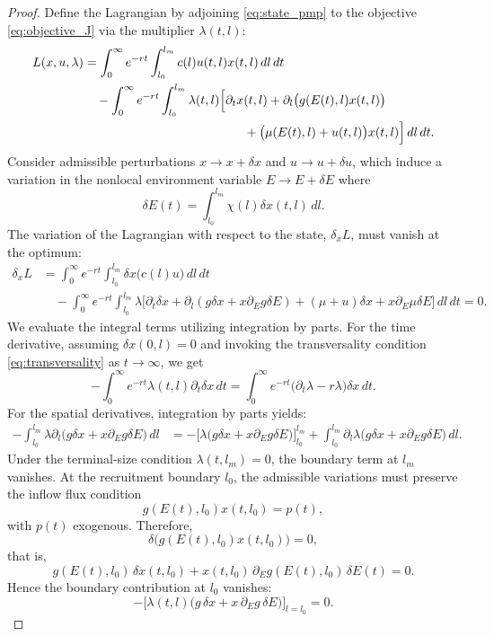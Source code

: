 \documentclass[pdflatex,sn-mathphys-num]{sn-jnl}
\theoremstyle{thmstyleone}
\theoremstyle{definition}
\theoremstyle{remark}
\begin{document}
\begin{proof}
Define the Lagrangian by adjoining \eqref{eq:state_pmp} to the objective
\eqref{eq:objective_J} via the multiplier $\lambda(t,l)$:
\begin{align*}
L(x, u, \lambda) 
&= \int_0^\infty e^{-rt} \int_{l_0}^{l_m} c(l)u(t,l)x(t,l)\,dl\,dt \\
&\quad - \int_0^\infty e^{-rt} \int_{l_0}^{l_m} \lambda(t,l) \Big[ \partial_t x(t,l) + \partial_l\bigl(g(E(t),l)x(t,l)\bigr) \\
&\hspace{4.5cm} + \bigl(\mu(E(t),l) + u(t,l)\bigr)x(t,l) \Big]\,dl\,dt.
\end{align*}
Consider admissible perturbations $x \to x + \delta x$ and $u \to u + \delta u$, which induce a variation in the nonlocal environment variable $E \to E + \delta E$ where
\[
\delta E(t) = \int_{l_0}^{l_m} \chi(l)\delta x(t,l)\,dl.
\]
The variation of the Lagrangian with respect to the state, $\delta_x L$, must vanish at the optimum:
\begin{align*}
\delta_x L &= \int_0^\infty e^{-rt} \int_{l_0}^{l_m} \delta x \big(c(l)u\big)\,dl\,dt \\
&\quad - \int_0^\infty e^{-rt} \int_{l_0}^{l_m} \lambda \Big[ \partial_t \delta x + \partial_l(g \delta x + x \partial_Eg \delta E) + (\mu + u)\delta x + x \partial_E\mu \delta E \Big]\,dl\,dt = 0.
\end{align*}
We evaluate the integral terms utilizing integration by parts. For the time derivative, assuming $\delta x(0,l) = 0$ and invoking the transversality condition \eqref{eq:transversality} as $t\to\infty$, we get
\[
-\int_0^\infty e^{-rt} \lambda(t,l) \partial_t \delta x\,dt = \int_0^\infty e^{-rt} \bigl(\partial_t \lambda - r\lambda\bigr)\delta x\,dt.
\]
For the spatial derivatives, integration by parts yields:
\begin{align*}
-\int_{l_0}^{l_m} \lambda \partial_l\big(g \delta x + x \partial_Eg \delta E\big)\,dl 
&= - \Big[ \lambda \big(g \delta x + x \partial_Eg \delta E\big) \Big]_{l_0}^{l_m} 
+ \int_{l_0}^{l_m} \partial_l \lambda \big(g \delta x + x \partial_Eg \delta E\big)\,dl.
\end{align*}
Under the terminal-size condition $\lambda(t,l_m) = 0$, the boundary term at $l_m$ vanishes. 
At the recruitment boundary $l_0$, the admissible variations must preserve the inflow flux condition
\[
g(E(t),l_0)x(t,l_0)=p(t),
\]
with $p(t)$ exogenous. Therefore,
\[
\delta\!\big(g(E(t),l_0)x(t,l_0)\big)=0,
\]
that is,
\[
g(E(t),l_0)\,\delta x(t,l_0)+x(t,l_0)\,\partial_E g(E(t),l_0)\,\delta E(t)=0.
\]
Hence the boundary contribution at $l_0$ vanishes:
\[
-\Big[\lambda(t,l)\big(g\,\delta x+x\,\partial_E g\,\delta E\big)\Big]_{l=l_0}=0.
\]


\end{proof}
\end{document}
